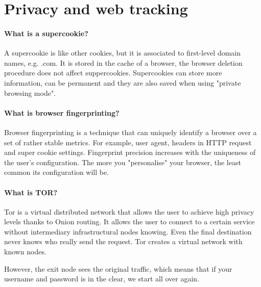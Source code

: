 \section{Privacy and web tracking}
\paragraph{What is a supercookie?}
A supercookie is like other cookies, but it is associated to first-level domain names, e.g. .com. It is stored in the cache of a browser, the browser deletion procedure does not affect suppercookies. Supercookies can store more information, can be permanent and they are also saved when using "private browsing mode".

\paragraph{What is browser fingerprinting?}
Browser fingerprinting is a technique that can uniquely identify a browser over a set of rather stable metrics. For example, user agent, headers in HTTP request and super cookie settings. Fingerprint precision increases with the uniqueness of the user's configuration. The more you "personalise" your browser, the least common its configuration will be.

\paragraph{What is TOR?}
Tor is a virtual distributed network that allows the user to achieve high privacy levels thanks to Onion routing. It allows the user to connect to a certain service without intermediary infrastructural nodes knowing. Even the final destination never knows who really send the request. Tor creates a virtual network with known nodes.  

However, the exit node sees the original traffic, which means that if your username and password is in the clear, we start all over again.